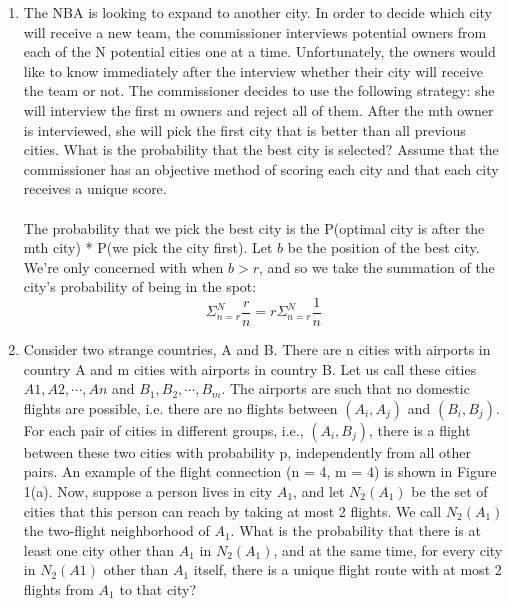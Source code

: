 \begin{enumerate}
  \item The NBA is looking to expand to another city. In order to decide which city will receive a new team, the commissioner interviews potential owners from each of the N potential cities one at a time. Unfortunately, the owners would like to know immediately after the interview whether their city will receive the team or not. The commissioner decides to use the following strategy: she will interview the first m owners and reject all of them. After the mth owner is interviewed, she will pick the first city that is better than all previous cities. What is the probability that the best city is selected? Assume that the commissioner has an objective method of scoring each city and that each city receives a unique score.\\\\

  The probability that we pick the best city is the P(optimal city is after the mth city) * P(we pick the city first). Let $b$ be the position of the best city. We're only concerned with when $b > r$, and so we take the summation of the city's probability of being in the spot:
  $$\Sigma_{n=r}^N \frac{r}{n} = r \Sigma_{n=r}^N \frac{1}{n}$$

  \item Consider two strange countries, A and B. There are n cities with airports in country A and m cities with airports in country B. Let us call these cities $A1, A2, \cdots , An$ and $B_1, B_2, \cdots , B_m$. The airports are such that no domestic flights are possible, i.e. there are no flights between $(A_i,A_j)$ and $(B_i,B_j)$. For each pair of cities in different groups, i.e., $(A_i,B_j)$, there is a flight between these two cities with probability p, independently from all other pairs. An example of the flight connection (n = 4, m = 4) is shown in Figure 1(a). Now, suppose a person lives in city $A_1$, and let $N_2(A_1)$ be the set of cities that this person can reach by taking at most 2 flights. We call $N_2(A_1)$ the two-flight neighborhood of $A_1$. What is the probability that there is at least one city other than $A_1$ in $N_2(A_1)$, and at the same time, for every city in $N_2(A1)$ other than $A_1$ itself, there is a unique flight route with at most 2 flights from $A_1$ to that city?\\\\
\end{enumerate}


